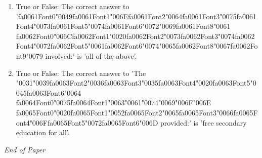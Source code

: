 \documentclass[12pt]{article}
\begin{document}
\begin{enumerate}[label=\arabic*.]
\item True or False: The correct answer to '{\csname fa0061Font0\endcsname\char"0049}{\csname fa0061Font1\endcsname\char"006E}{\csname fa0061Font2\endcsname\char"0064}{\csname fa0061Font3\endcsname\char"0075}{\csname fa0061Font4\endcsname\char"0073}{\csname fa0061Font5\endcsname\char"0074}{\csname fa0061Font6\endcsname\char"0072}{\char"0069}{\csname fa0061Font8\endcsname\char"0061} {\csname fa0062Font0\endcsname\char"006C}{\csname fa0062Font1\endcsname\char"0020}{\csname fa0062Font2\endcsname\char"0073}{\csname fa0062Font3\endcsname\char"0074}{\csname fa0062Font4\endcsname\char"0072}{\csname fa0062Font5\endcsname\char"0061}{\csname fa0062Font6\endcsname\char"0074}{\char"0065}{\csname fa0062Font8\endcsname\char"0067}{\csname fa0062Font9\endcsname\char"0079} involved:' is 'all of the above'.
\item True or False: The correct answer to 'The {\char"0031}{\char"0039}{\csname fa0063Font2\endcsname\char"0036}{\csname fa0063Font3\endcsname\char"0035}{\csname fa0063Font4\endcsname\char"0020}{\csname fa0063Font5\endcsname\char"0045}{\csname fa0063Font6\endcsname\char"0064} {\csname fa0064Font0\endcsname\char"0075}{\csname fa0064Font1\endcsname\char"0063}{\char"0061}{\char"0074}{\char"0069}{\char"006F}{\char"006E} {\csname fa0065Font0\endcsname\char"0020}{\csname fa0065Font1\endcsname\char"0052}{\csname fa0065Font2\endcsname\char"0065}{\csname fa0065Font3\endcsname\char"0066}{\csname fa0065Font4\endcsname\char"006F}{\csname fa0065Font5\endcsname\char"0072}{\csname fa0065Font6\endcsname\char"006D} provided:' is 'free secondary education for all'.
\end{enumerate}

\vfill
\noindent\textit{End of Paper}
\end{document}
